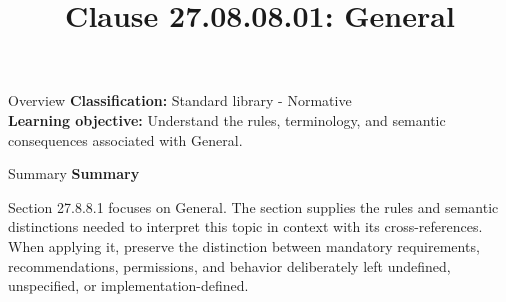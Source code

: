 \documentclass[10pt,letterpaper]{article}
\title{Clause 27.08.08.01: General}
\author{}
\date{}
\begin{document}
\maketitle
\begin{CornellOverviewBox}{Overview}
\textbf{Classification:} Standard library - Normative\\[2pt]
\textbf{Learning objective:} Understand the rules, terminology, and semantic consequences associated with General.
\end{CornellOverviewBox}\begin{CornellSummaryBox}{Summary}
{\sffamily\bfseries\color{Accent} Summary}\par\vspace{3pt}Section 27.8.8.1 focuses on General. The section supplies the rules and semantic distinctions needed to interpret this topic in context with its cross-references. When applying it, preserve the distinction between mandatory requirements, recommendations, permissions, and behavior deliberately left undefined, unspecified, or implementation-defined.
\end{CornellSummaryBox}
\end{document}
